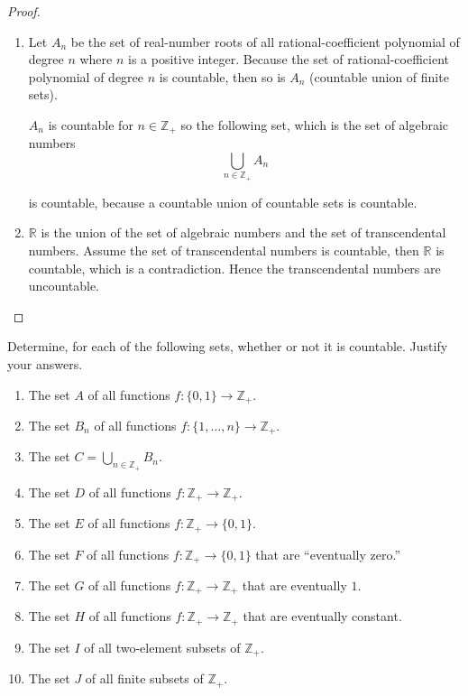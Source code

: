 \begin{proof}
    \begin{enumerate}[label={(\alph*)}]
        \item Let $A_{n}$ be the set of real-number roots of all rational-coefficient polynomial of degree $n$ where $n$ is a positive integer. Because the set of rational-coefficient polynomial of degree $n$ is countable, then so is $A_{n}$ (countable union of finite sets).

              $A_{n}$ is countable for $n\in\mathbb{Z}_{+}$ so the following set, which is the set of algebraic numbers
              \[
                  \bigcup_{n\in\mathbb{Z}_{+}}A_{n}
              \]

              is countable, because a countable union of countable sets is countable.
        \item $\mathbb{R}$ is the union of the set of algebraic numbers and the set of transcendental numbers. Assume the set of transcendental numbers is countable, then $\mathbb{R}$ is countable, which is a contradiction. Hence the transcendental numbers are uncountable.
    \end{enumerate}
\end{proof}

\begin{exercise}\label{chapter1:section7:exercise5}
    Determine, for each of the following sets, whether or not it is countable. Justify your answers.
    \begin{enumerate}[label={(\alph*)}]
        \item The set $A$ of all functions $f: \{ 0, 1 \}\to \mathbb{Z}_{+}$.
        \item The set $B_{n}$ of all functions $f: \{ 1, \ldots, n \}\to \mathbb{Z}_{+}$.
        \item The set $C = \bigcup_{n\in\mathbb{Z}_{+}}B_{n}$.
        \item The set $D$ of all functions $f: \mathbb{Z}_{+}\to \mathbb{Z}_{+}$.
        \item The set $E$ of all functions $f: \mathbb{Z}_{+}\to \{ 0, 1 \}$.
        \item The set $F$ of all functions $f: \mathbb{Z}_{+}\to \{ 0, 1 \}$ that are ``eventually zero{.}''
        \item The set $G$ of all functions $f: \mathbb{Z}_{+}\to\mathbb{Z}_{+}$ that are eventually $1$.
        \item The set $H$ of all functions $f: \mathbb{Z}_{+}\to\mathbb{Z}_{+}$ that are eventually constant.
        \item The set $I$ of all two-element subsets of $\mathbb{Z}_{+}$.
        \item The set $J$ of all finite subsets of $\mathbb{Z}_{+}$.
    \end{enumerate}
\end{exercise}

